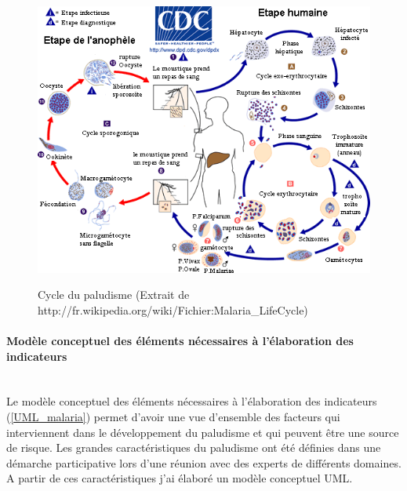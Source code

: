 \begin{center}
\begin{figure}[h] \centering
\includegraphics[width=14cm]{malaria}\\
\caption{\label{cyclemalaria} Cycle du paludisme (Extrait de  http://fr.wikipedia.org/wiki/Fichier:Malaria\_LifeCycle)}
\end{figure}
\end{center}

\newpage

\paragraph{Modèle conceptuel des éléments nécessaires à l'élaboration des indicateurs\\\\}
Le modèle conceptuel des éléments nécessaires à l'élaboration des indicateurs (\ref{UML_malaria}) permet d'avoir une vue d'ensemble des facteurs qui interviennent dans le développement du paludisme et qui peuvent être une source de risque. Les grandes caractéristiques du paludisme ont été définies dans une démarche participative lors d'une réunion avec des experts de différents domaines. A partir de ces caractéristiques j'ai élaboré un modèle conceptuel UML.\\

\newpage

